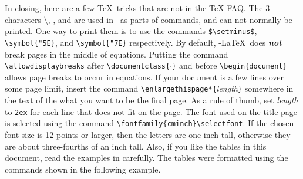 \documentclass[11pt,titlepage]{article}
\def\AmS{{$\mathcal{A}$\kern-.14em\lower.5ex\hbox{$\mathcal{M}$}%
\kern-.05em$\mathcal{S}$}}
\def\AmSLaTeX{\protect\AmS-\protect\LaTeX}
\begin{document}
In closing, here are a few \TeX\ tricks that are not in the \TeX -FAQ.  The 3
characters $\setminus$, , and  are used in \LaTeXe\ as
parts of commands, and can not normally be printed.  One way to print them is
to use the commands \verb+$\setminus$+, \verb+\symbol{"5E}+, and
\verb+\symbol{"7E}+ respectively.  By default, \AmSLaTeX\ does
\textbf{\textit{not}} break pages in the middle of equations.  Putting the
command \verb+\allowdisplaybreaks+ after \verb+\documentclass{+$\cdot$\verb+}+
and before \verb+\begin{document}+ allows page breaks to occur in equations.
  If your document is a few lines over some page limit, insert the command
  \verb+\enlargethispage*{+\textit{length}\verb+}+ somewhere in the text of
  the what you want to be the final page.  As a rule of thumb, set
  \textit{length} to \verb+2ex+ for each line that does not fit on the page.
  The font used on the title page is selected using the command
  \verb+\fontfamily{cminch}\selectfont+.  If the chosen font size is 12 points
  or larger, then the letters are one inch tall, otherwise they are about
  three-fourths of an inch tall.  Also, if you like the tables in this
  document, read the examples in \cite[pages 204--207]{Lam94a} carefully. The
  tables were formatted using the commands shown in the following example.
\end{document}
